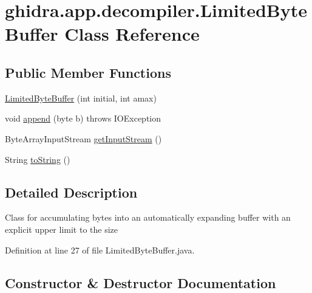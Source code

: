 \hypertarget{classghidra_1_1app_1_1decompiler_1_1_limited_byte_buffer}{}\section{ghidra.\+app.\+decompiler.\+Limited\+Byte\+Buffer Class Reference}
\label{classghidra_1_1app_1_1decompiler_1_1_limited_byte_buffer}
\subsection*{Public Member Functions}
\begin{DoxyCompactItemize}
\item 
\mbox{\hyperlink{classghidra_1_1app_1_1decompiler_1_1_limited_byte_buffer_a27d2092da0c246cd63807c39b465158e}{Limited\+Byte\+Buffer}} (int initial, int amax)
\item 
void \mbox{\hyperlink{classghidra_1_1app_1_1decompiler_1_1_limited_byte_buffer_aca06d164ed729fd227302717cb27652d}{append}} (byte b)  throws I\+O\+Exception 
\item 
Byte\+Array\+Input\+Stream \mbox{\hyperlink{classghidra_1_1app_1_1decompiler_1_1_limited_byte_buffer_af3478c305c9bd3447aff656ba4376d9d}{get\+Input\+Stream}} ()
\item 
String \mbox{\hyperlink{classghidra_1_1app_1_1decompiler_1_1_limited_byte_buffer_a90f56455ddf8428dca1c129102d49697}{to\+String}} ()
\end{DoxyCompactItemize}


\subsection{Detailed Description}
Class for accumulating bytes into an automatically expanding buffer with an explicit upper limit to the size 

Definition at line 27 of file Limited\+Byte\+Buffer.\+java.



\subsection{Constructor \& Destructor Documentation}
\mbox{\label{classghidra_1_1app_1_1decompiler_1_1_limited_byte_buffer_a27d2092da0c246cd63807c39b465158e}} 
